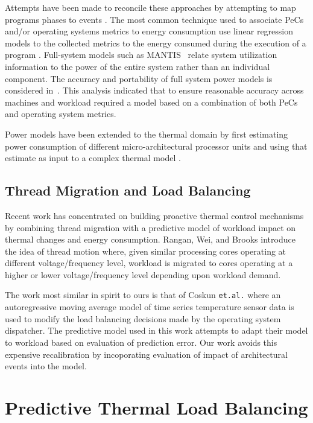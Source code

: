 \documentclass[acmtaco]{acmtrans2m}
\begin{document}
Attempts have been made to reconcile these approaches by attempting to
map programs phases to events \cite{Isci2006}.  The most common
technique used to associate PeCs and/or operating systems metrics to
energy consumption use linear regression models to the collected metrics
to the energy consumed during the execution of a program
\cite{Contreras2005}\cite{Economou2006}\cite{Isci2003b}\cite{Bircher2007}.
Full-system models such as MANTIS~\cite{Economou2006}\cite{Rivoire2008a}
relate system utilization information to the power of the entire system
rather than an individual component.  The accuracy and portability of
full system power models is considered in~\cite{Rivoire2008b}.  This
analysis indicated that to ensure reasonable accuracy across machines
and workload required a model based on a combination of both PeCs and
operating system metrics.

Power models have been extended to the thermal domain by first
estimating power consumption of different micro-architectural processor
units and using that estimate as input to a complex thermal model
\cite{Bellosa2003}\cite{Skadron2004}. 

\subsection{Thread Migration and Load Balancing}
\label{sec:priorpredictive}
Recent work has concentrated on building proactive thermal control
mechanisms by combining thread migration with a predictive model of
workload impact on thermal changes and energy consumption.   Rangan,
Wei, and Brooks \cite{Rangan2009} introduce the idea of thread motion
where, given similar processing cores operating at different
voltage/frequency level, workload is migrated to cores operating at a
higher or lower voltage/frequency level depending upon workload demand. 

The work most similar in spirit to ours is that of Coskun
\texttt{et.al.} \cite{Coskun2008d} where an autoregressive moving
average model of time series temperature sensor data is used to modify
the load balancing decisions made by the operating system dispatcher.
The predictive model used in this work attempts to adapt their model to
workload based on evaluation of prediction error.  Our work avoids this
expensive recalibration by incoporating evaluation of impact of
architectural events into the model.

\section{Predictive Thermal Load Balancing}
\label{sec:policies}
\end{document}
